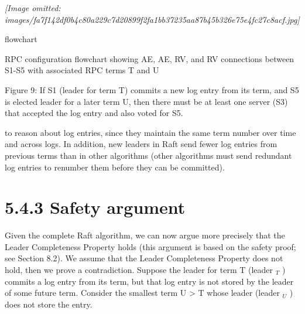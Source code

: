 \documentclass[
]{article}
\begin{document}
\textit{[Image omitted: images/fa7f142df0b4c80a229c7d20899f2fa1bb37235aa87b45b326e75e4fc27c8acf.jpg]}

flowchart

RPC configuration flowchart showing AE, AE, RV, and RV connections
between S1-S5 with associated RPC terms T and U

Figure 9: If S1 (leader for term T) commits a new log entry from its
term, and S5 is elected leader for a later term U, then there must be at
least one server (S3) that accepted the log entry and also voted for S5.

to reason about log entries, since they maintain the same term number
over time and across logs. In addition, new leaders in Raft send fewer
log entries from previous terms than in other algorithms (other
algorithms must send redundant log entries to renumber them before they
can be committed).

\section{5.4.3 Safety argument}\label{safety-argument}

Given the complete Raft algorithm, we can now argue more precisely that
the Leader Completeness Property holds (this argument is based on the
safety proof; see Section 8.2). We assume that the Leader Completeness
Property does not hold, then we prove a contradiction. Suppose the
leader for term T (leader \(_T\) ) commits a log entry from its term,
but that log entry is not stored by the leader of some future term.
Consider the smallest term U \textgreater{} T whose leader (leader
\(_U\) ) does not store the entry.
\end{document}
